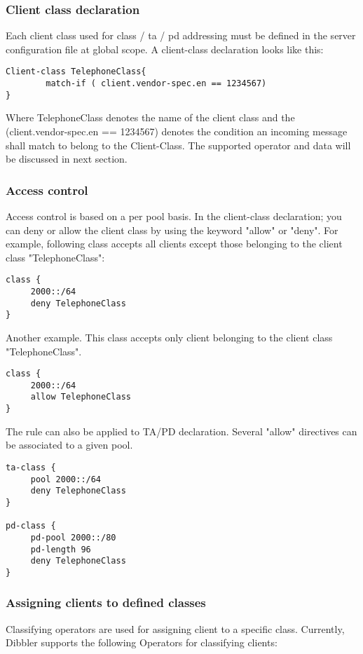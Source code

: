 \subsubsection{Client class  declaration}
Each client class used for class / ta / pd addressing must be defined
in the server configuration file at global scope. A client-class
declaration looks like this:

\begin{lstlisting}
Client-class TelephoneClass{
        match-if ( client.vendor-spec.en == 1234567)
}
\end{lstlisting}

Where TelephoneClass denotes the name of the client class and the
(client.vendor-spec.en == 1234567) denotes the condition an incoming
message shall match to belong to the Client-Class. The supported
operator and data will be discussed in next section.


\subsubsection{Access control}
Access control is based on a per pool basis. In the client-class
declaration; you can deny or allow the client class by using the
keyword "allow" or "deny". For example, following class accepts all
clients except those belonging to the client class "TelephoneClass":

\begin{lstlisting}
class {
     2000::/64
     deny TelephoneClass
}
\end{lstlisting}

Another example. This class accepts only client belonging to the
client class "TelephoneClass".

\begin{lstlisting}
class {
     2000::/64
     allow TelephoneClass
}
\end{lstlisting}

The rule can also be applied to TA/PD declaration. Several "allow"
directives can be associated to a given pool.

\begin{lstlisting}
ta-class {
     pool 2000::/64
     deny TelephoneClass
}

pd-class {
     pd-pool 2000::/80
     pd-length 96
     deny TelephoneClass
}
\end{lstlisting}

\subsubsection{Assigning clients to defined classes}
Classifying operators are used for assigning client to a specific class.
Currently, Dibbler supports the following Operators for classifying clients:

